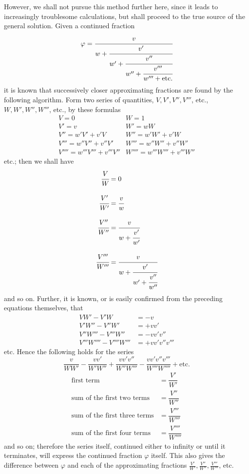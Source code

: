 However, we shall not pursue this method further here, since it leads to increasingly troublesome calculations, but shall proceed to the true source of the general solution.
Given a continued fraction
\[
\varphi=\cfrac{v}{w+\cfrac{v'}{w'+\cfrac{v''}{w''+\cfrac{v'''}{w'''+\text{etc.}}}}}
\]
it is known that successively closer approximating fractions are found by the following algorithm. Form two series of quantities, $V,V',V'',V'''$, etc., $W,W',W'',W'''$, etc., by these formulas
\[
\begin{array}{ll}
V=0&W=1\\[4pt]
V'=v&W'=wW\\[4pt]
V''=w'V'+v'V&W''=w'W'+v'W\\[4pt]
V'''=w''V''+v''V'&W'''=w''W''+v''W'\\[4pt]
V''''=w'''V'''+v'''V''&W''''=w'''W'''+v'''W''
\end{array}
\]
etc.; then we shall have
\[
\begin{aligned}
\cfrac VW&=0\\[9pt]
\cfrac{V'}{W'}&=\cfrac vw\\[9pt]
\cfrac{V''}{W''}&=\cfrac v{w+\cfrac{v'}{w'}}\\[9pt]
\cfrac{V'''}{W'''}&=\cfrac v{w+\cfrac{v'}{w'+\cfrac{v''}{w''}}}
\end{aligned}
\]
and so on. Further, it is known, or is easily confirmed from the preceding equations themselves, that
\[
\begin{aligned}
VW'-V'W&=-v\\
V'W''-V''W'&=+vv'\\
V''W'''-V'''W''&=-vv'v''\\
V'''W''''-V''''W'''&=+vv'v''v'''
\end{aligned}
\]
etc. Hence the following holds for the series
\[
\frac v{WW'}-\frac{vv'}{W'W''}+\frac{vv'v''}{W''W'''}-\frac{vv'v''v'''}{W'''W''''}+\text{etc.}
\]
\[
\begin{array}{ll}
\text{first term}&=\dfrac{V'}{W'}\\[10pt]
\text{sum of the first two terms}&=\dfrac{V''}{W''}\\[10pt]
\text{sum of the first three terms}&=\dfrac{V'''}{W'''}\\[10pt]
\text{sum of the first four terms}&=\dfrac{V''''}{W''''}
\end{array}
\]
and so on; therefore the series itself, continued either to infinity or until it terminates, will express the continued fraction $\varphi$ itself. This also gives the difference between $\varphi$ and each of the approximating fractions $\frac{V'}{W'},\frac{V''}{W''},\frac{V'''}{W'''}$, etc.

